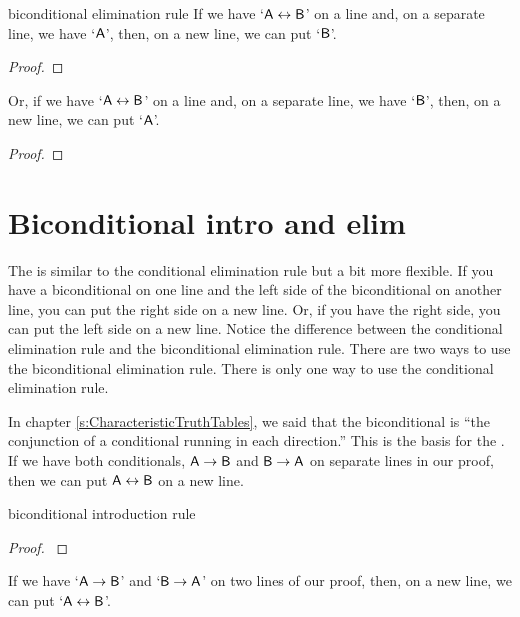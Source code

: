 \begin{factboxy}{biconditional elimination rule}\label{be-rule}
\small{If we have `$\mathsf{A}\leftrightarrow\mathsf{B}$' on a line and, on a separate line, we have `$\mathsf{A}$', then, on a new line, we can put `$\mathsf{B}$'.}

\begin{proof}
	 
\end{proof}

\small{Or, if we have `$\mathsf{A}\leftrightarrow\mathsf{B}$' on a line and, on a separate line, we have `$\mathsf{B}$', then, on a new line, we can put `$\mathsf{A}$'.} 

\begin{proof}
	 
\end{proof}

\end{factboxy}



\section{Biconditional intro and elim}\label{s:bi-rules}

The  is similar to the conditional elimination rule but a bit more flexible. If you have a biconditional on one line and the left side of the biconditional on another line, you can put the right side on a new line. Or, if you have the right side, you can put the left side on a new line. Notice the difference between the conditional elimination rule and the biconditional elimination rule. There are two ways to use the biconditional elimination rule. There is only one way to use the conditional elimination rule.

In chapter \ref{s:CharacteristicTruthTables}, we said that the biconditional is ``the conjunction of a conditional running in each direction.'' This is the basis for the . If we have both conditionals, $\mathsf{A} \rightarrow \mathsf{B}$ and $\mathsf{B} \rightarrow \mathsf{A}$ on separate lines in our proof, then we can put $\mathsf{A} \leftrightarrow \mathsf{B}$ on a new line.

\begin{factboxy}{biconditional introduction rule}
\begin{proof}\label{eiff-I}
	 
\end{proof}

\small{If we have `$\mathsf{A}\rightarrow\mathsf{B}$' and `$\mathsf{B}\rightarrow\mathsf{A}$' on two lines of our proof, then, on a new line, we can put `$\mathsf{A}\leftrightarrow\mathsf{B}$'.}

\end{factboxy}



